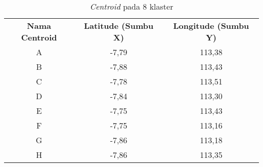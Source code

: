 \begin{table}[H]
\footnotesize
\centering
\begin{tabular}{ccc}
\rowcolor[HTML]{4472C4} 
{\color[HTML]{FFFFFF} \textbf{Nama   Centroid}} & {\color[HTML]{FFFFFF} \textbf{Latitude (Sumbu X)}} & {\color[HTML]{FFFFFF} \textbf{Longitude (Sumbu Y)}} \\
\rowcolor[HTML]{D9E1F2} 
A & -7,79 & 113,38 \\
B & -7,88 & 113,43 \\
\rowcolor[HTML]{D9E1F2} 
C & -7,78 & 113,51 \\
D & -7,84 & 113,30 \\
\rowcolor[HTML]{D9E1F2} 
E & -7,75 & 113,43 \\
F & -7,75 & 113,16 \\
\rowcolor[HTML]{D9E1F2} 
G & -7,86 & 113,18 \\
H & -7,86 & 113,35
\end{tabular}
\caption{\textit{Centroid} pada 8 klaster}
\label{tab:center8}
\end{table}